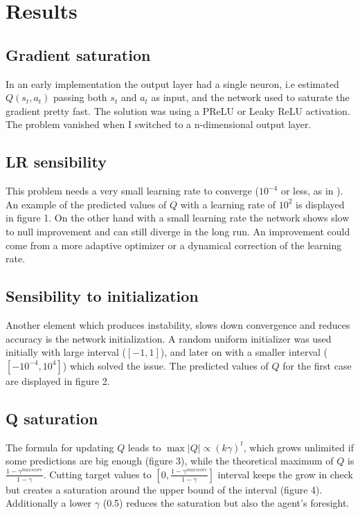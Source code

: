 \documentclass[]{article}
\begin{document}
\section{Results}
\subsection{Gradient saturation}
In an early implementation the output layer had a single neuron, i.e estimated $Q(s_t, a_t)$ passing both $s_t$ and $a_t$ as input, and the network used to saturate the gradient pretty fast. The solution was using a PReLU or Leaky ReLU activation. The problem vanished when I switched to a n-dimensional output layer.

\subsection{LR sensibility}
This problem needs a very small learning rate to converge ($10^{-4}$ or less, as in \cite{Mnih2015}).
An example of the predicted values of $Q$ with a learning rate of $10^2$ is displayed in figure 1.
On the other hand with a small learning rate the network shows slow to null improvement and can still diverge in the long run.
An improvement could come from a more adaptive optimizer or a dynamical correction of the learning rate.

\subsection{Sensibility to initialization}
Another element which produces instability, slows down convergence and reduces accuracy is the network initialization.
A random uniform initializer was used initially with large interval ($[-1,1]$), and later on with a smaller interval ($[-10^{-4}, 10^{4}]$) which solved the issue. The predicted values of $Q$ for the first case are displayed in figure 2.

\subsection{Q saturation}
The formula for updating $Q$ leads to $\max |Q| \propto (k\gamma)^t$, which grows unlimited if some predictions are big enough (figure 3), while the theoretical maximum of $Q$ is $\frac{1-\gamma^{max score}}{1-\gamma}$. Cutting target values to $[0,\frac{1-\gamma^{max score}}{1-\gamma}]$ interval keeps the grow in check but creates a saturation around the upper bound of the interval (figure 4). Additionally a lower $\gamma$ (0.5) reduces the saturation but also the agent's foresight.
\end{document}
